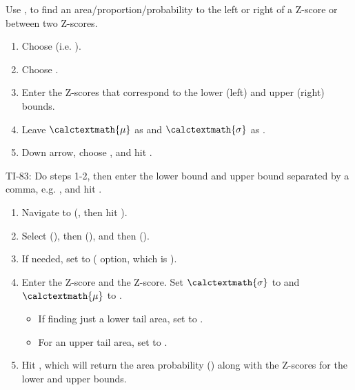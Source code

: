 \begin{termBox}{
Use  ,  to find an area/proportion/probability to the left or right of a Z-score or between two Z-scores.\vspace{-1mm}
\begin{enumerate}
\setlength{\itemsep}{0mm}
\item Choose   (i.e. ).
\item Choose .
\item Enter the Z-scores that correspond to the lower (left) and upper (right) bounds.
\item Leave $\calctextmath{\mu}$ as  and $\calctextmath{\sigma}$ as .
\item Down arrow, choose , and hit .\vspace{-1.5mm}
\end{enumerate}
TI-83: Do steps 1-2, then enter the lower bound and upper bound separated by a comma, e.g. , and hit .}
\end{termBox}

\begin{termBox}{
\begin{enumerate}
\setlength{\itemsep}{0mm}
\item Navigate to  (, then hit ).
\item Select  (), then  (), and then  ().
\item If needed, set  to  ( option, which is ).
\item Enter the  Z-score and the  Z-score. Set $\calctextmath{\sigma}$ to  and $\calctextmath{\mu}$ to .\vspace{-1.5mm}
  \begin{itemize}
  \setlength{\itemsep}{0mm}
  \item If finding just a lower tail area, set  to .
  \item For an upper tail area, set  to .
  \end{itemize}
\item Hit , which will return the area probability () along with the Z-scores for the lower and upper bounds.
\end{enumerate}
}
\end{termBox}

